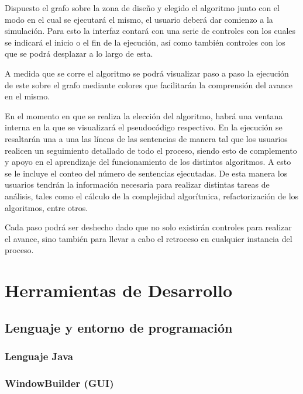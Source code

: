 \documentclass{book}
\begin{document}
	Dispuesto el grafo sobre la zona de diseño y elegido el algoritmo junto con el modo en el cual se ejecutará el mismo, el usuario deberá dar comienzo a la simulación. Para esto la interfaz contará con una serie de controles con los cuales se indicará el inicio o el fin de la ejecución, así como también controles con los que se podrá desplazar a lo largo de esta.
	\par
	A medida que se corre el algoritmo se podrá visualizar paso a paso la ejecución de este sobre el grafo mediante colores que facilitarán la comprensión del avance en el mismo.
	\par
	En el momento en que se realiza la elección del algoritmo, habrá una ventana interna en la que se visualizará el pseudocódigo respectivo. En la ejecución se resaltarán una a una las líneas de las sentencias de manera tal que los usuarios realicen un seguimiento detallado de todo el proceso, siendo esto de complemento y apoyo en el aprendizaje del funcionamiento de los distintos algoritmos. A esto se le incluye el conteo del número de sentencias ejecutadas. De esta manera los usuarios tendrán la información necesaria para realizar distintas tareas de análisis, tales como el cálculo de la complejidad algorítmica, refactorización de los algoritmos, entre otros.
	\par
	Cada paso podrá ser deshecho dado que no solo existirán controles para realizar el avance, sino también para llevar a cabo el retroceso en cualquier instancia del proceso.



%
%
\chapter{Herramientas de Desarrollo}


\section{Lenguaje y entorno de programación}


\subsection{Lenguaje Java}


\subsection{WindowBuilder (GUI)}
\end{document}
